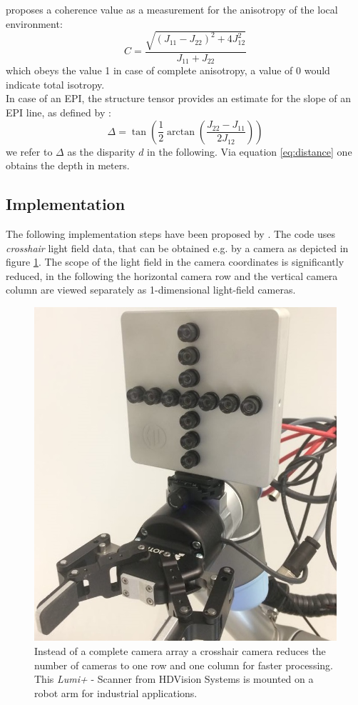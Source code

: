 \documentclass  [
  paper    = a4,
  BCOR     = 10mm,
  twoside,
  fontsize = 12pt,
  fleqn,
  toc      = bibnumbered,
  toc      = listofnumbered,
  numbers  = noendperiod,
  headings = normal,
  listof   = leveldown,
  version  = 3.03
]                                       {scrreprt}
\begin{document}
   \cite{jahne2013digitale} proposes a coherence value as a measurement for the anisotropy of the local environment:
 \begin{equation}\label{eq:coherence}
 C = \frac{\sqrt{(J_{11} - J_{22})^2 + 4J_{12}^2}}{J_{11} + J_{22}}
 \end{equation}
 which obeys the value 1 in case of complete anisotropy, a value of 0 would indicate total isotropy.\\
 In case of an EPI, the structure tensor provides an estimate for the slope of an EPI line, as defined by \cite{bigun1987optimal}:
 \begin{equation}\label{eq:disparity}
 \Delta = \tan\left(\frac{1}{2} \arctan\left( \frac{J_{22}-J_{11}}{2J_{12}}\right)\right)
 \end{equation}
 we refer to $\Delta$ as the disparity $d$ in the following. Via equation \ref{eq:distance} one obtains the depth in meters.
 
 \subsection{Implementation}
 The following implementation steps have been proposed by \cite{wanner2014orientation}. The code uses \textit{crosshair} light field data, that can be obtained e.g. by a camera as depicted in figure \ref{fig:lumiplus}. The scope of the light field in the camera coordinates is significantly reduced, in the following the horizontal camera row and the vertical camera column are viewed separately as 1-dimensional light-field cameras.\\
 \begin{figure}[]
 	\centering
 	\includegraphics[width=0.7\linewidth]{images/Lumiplus}
 	\caption[LumiPlus Scanner from HDVision Systems]{Instead of a complete camera array a crosshair camera reduces the number of cameras to one row and one column for faster processing. This \textit{Lumi+} - Scanner from HDVision Systems is mounted on a robot arm for industrial applications.}
 	\label{fig:lumiplus}
 \end{figure}
 
\end{document}

